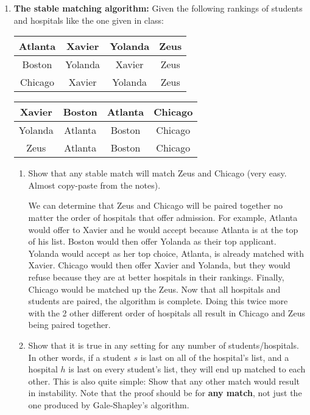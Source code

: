 \documentclass[letterpaper, 11pt]{article}
\begin{document}
\begin{enumerate}[leftmargin=*]
    \item \textbf{The stable matching algorithm:} Given the following rankings of students and hospitals like the one given in class:

    \begin{table}[H]
        \centering
        \begin{tabular}{|c||c|c|c|}
            \hline
            Atlanta  & Xavier & Yolanda & Zeus \\
            \hline
            Boston & Yolanda & Xavier & Zeus \\
            \hline
            Chicago & Xavier & Yolanda & Zeus\\
            \hline
        \end{tabular}
    \end{table}
    \vspace{-1em}
    \begin{table}[H]
        \centering
        \begin{tabular}{|c||c|c|c|}
            \hline
            Xavier & Boston & Atlanta & Chicago \\
            \hline
            Yolanda & Atlanta & Boston & Chicago \\
            \hline
            Zeus & Atlanta & Boston & Chicago \\
            \hline
        \end{tabular}
    \end{table}

    \begin{enumerate}
        \item Show that any stable match will match Zeus and Chicago (very easy. Almost copy-paste from the notes).

        We can determine that Zeus and Chicago will be paired together no matter the order of hospitals that offer admission. For example, Atlanta would offer to Xavier and he would accept because Atlanta is at the top of his list. Boston would then offer Yolanda as their top applicant. Yolanda would accept as her top choice, Atlanta, is already matched with Xavier. Chicago would then offer Xavier and Yolanda, but they would refuse because they are at better hospitals in their rankings. Finally, Chicago would be matched up the Zeus. Now that all hospitals and students are paired, the algorithm is complete. Doing this twice more with the 2 other different order of hospitals all result in Chicago and Zeus being paired together.
        
        \item Show that it is true in any setting for any number of students/hospitals. In other words, if a student $s$ is last on all of the hospital's list, and a hospital $h$ is last on every student's list, they will end up matched to each other. This is also quite simple: Show that any other match would result in instability. Note that the proof should be for \textbf{any match}, not just the one produced by Gale-Shapley's algorithm.


\end{enumerate}
\end{enumerate}
\end{document}
